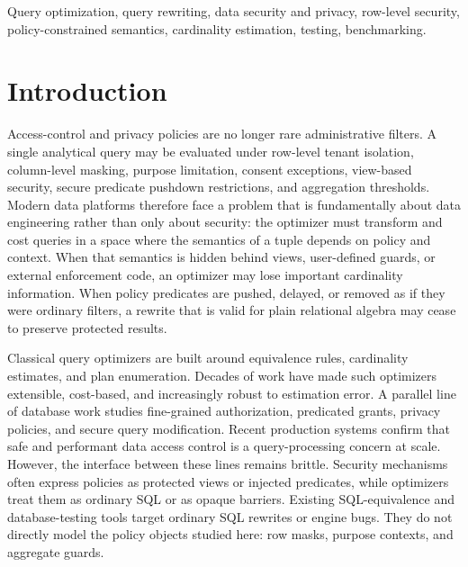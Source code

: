 \documentclass[conference]{IEEEtran}
\begin{document}
\begin{IEEEkeywords}
Query optimization, query rewriting, data security and privacy, row-level security, policy-constrained semantics, cardinality estimation, testing, benchmarking.
\end{IEEEkeywords}

\section{Introduction}
Access-control and privacy policies are no longer rare administrative filters. A single analytical query may be evaluated under row-level tenant isolation, column-level masking, purpose limitation, consent exceptions, view-based security, secure predicate pushdown restrictions, and aggregation thresholds. Modern data platforms therefore face a problem that is fundamentally about data engineering rather than only about security: the optimizer must transform and cost queries in a space where the semantics of a tuple depends on policy and context. When that semantics is hidden behind views, user-defined guards, or external enforcement code, an optimizer may lose important cardinality information. When policy predicates are pushed, delayed, or removed as if they were ordinary filters, a rewrite that is valid for plain relational algebra may cease to preserve protected results.

Classical query optimizers are built around equivalence rules, cardinality estimates, and plan enumeration\cite{selinger1979access,graefe1993volcano,graefe1995cascades,chaudhuri1998overview}. Decades of work have made such optimizers extensible, cost-based, and increasingly robust to estimation error\cite{stillger2001leo,babcock2005robust,leis2015job,marcus2021bao,yang2022balsa}. A parallel line of database work studies fine-grained authorization, predicated grants, privacy policies, and secure query modification\cite{stonebraker1974access,griffiths1976authorization,rizvi2004fgac,kabra2006redundancy,agrawal2005privacy,chaudhuri2007predicated}. Recent production systems confirm that safe and performant data access control is a query-processing concern at scale\cite{paduroiu2024membrane,xue2023sparkac,xue2020guardspark,dar2023rls}. However, the interface between these lines remains brittle. Security mechanisms often express policies as protected views or injected predicates, while optimizers treat them as ordinary SQL or as opaque barriers. Existing SQL-equivalence and database-testing tools target ordinary SQL rewrites or engine bugs\cite{chu2017cosette,chu2017hottsql,zhou2019symbolic,ding2024lia,wang2024qed,rigger2020norec,ba2024dqp}. They do not directly model the policy objects studied here: row masks, purpose contexts, and aggregate guards.
\end{document}

